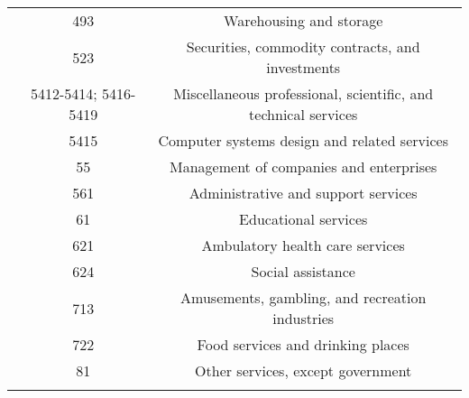 \begin{table}[]
\begin{center}
{\begin{tabular}{ccc}
& 493 & Warehousing and storage \\ 
& 523 & Securities, commodity contracts, and investments \\
& 5412-5414; 5416-5419 & Miscellaneous professional, scientific, and technical services \\
& 5415 & Computer systems design and related services \\ 
& 55 & Management of companies and enterprises \\ 
& 561 & Administrative and support services \\ 
& 61 & Educational services \\
& 621 & Ambulatory health care services \\ 
& 624 & Social assistance \\ 
& 713 & Amusements, gambling, and recreation industries \\ 
& 722 & Food services and drinking places \\
& 81 & Other services, except government \\ 
\vspace{-3pt} & \vspace{-3pt} \\ \hline
\end{tabular}
}
\end{center}
\end{table}



